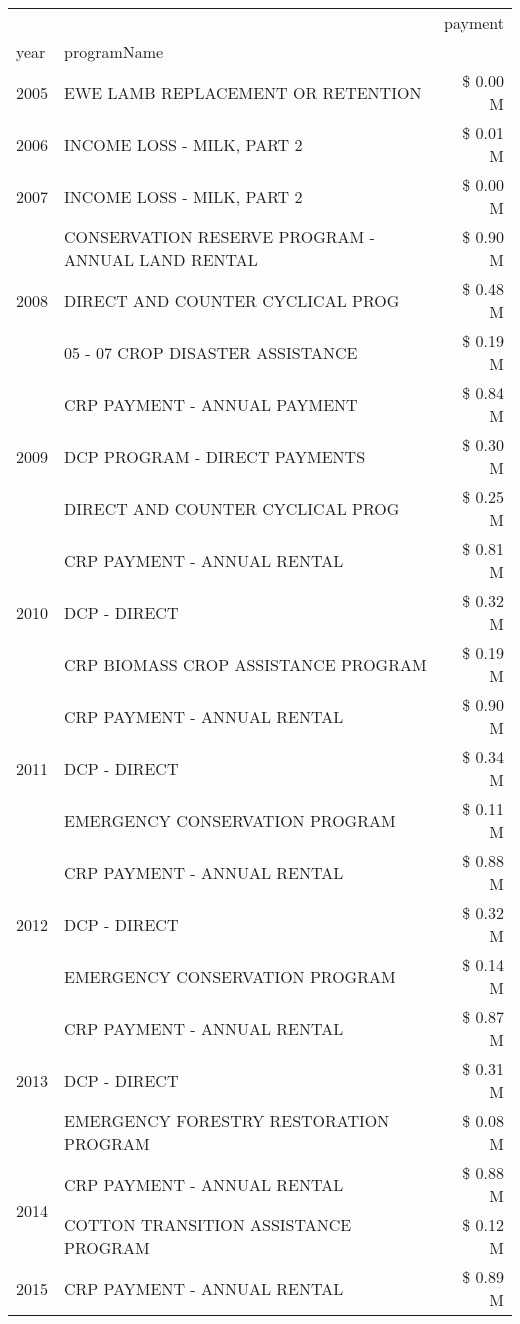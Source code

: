 \begin{tabular}{llr}
\toprule
 &  & payment \\
year & programName &  \\
\midrule
2005 & EWE LAMB REPLACEMENT OR RETENTION & \$ 0.00 M \\
\cline{1-3}
2006 & INCOME LOSS - MILK, PART 2 & \$ 0.01 M \\
\cline{1-3}
2007 & INCOME LOSS - MILK, PART 2 & \$ 0.00 M \\
\cline{1-3}
\multirow[t]{3}{*}{2008} & CONSERVATION RESERVE PROGRAM - ANNUAL LAND RENTAL & \$ 0.90 M \\
 & DIRECT AND COUNTER CYCLICAL PROG & \$ 0.48 M \\
 & 05 - 07 CROP DISASTER ASSISTANCE & \$ 0.19 M \\
\cline{1-3}
\multirow[t]{3}{*}{2009} & CRP PAYMENT - ANNUAL PAYMENT & \$ 0.84 M \\
 & DCP PROGRAM - DIRECT PAYMENTS & \$ 0.30 M \\
 & DIRECT AND COUNTER CYCLICAL PROG & \$ 0.25 M \\
\cline{1-3}
\multirow[t]{3}{*}{2010} & CRP PAYMENT - ANNUAL RENTAL & \$ 0.81 M \\
 & DCP - DIRECT & \$ 0.32 M \\
 & CRP BIOMASS CROP ASSISTANCE PROGRAM & \$ 0.19 M \\
\cline{1-3}
\multirow[t]{3}{*}{2011} & CRP PAYMENT - ANNUAL RENTAL & \$ 0.90 M \\
 & DCP - DIRECT & \$ 0.34 M \\
 & EMERGENCY CONSERVATION PROGRAM & \$ 0.11 M \\
\cline{1-3}
\multirow[t]{3}{*}{2012} & CRP PAYMENT - ANNUAL RENTAL & \$ 0.88 M \\
 & DCP - DIRECT & \$ 0.32 M \\
 & EMERGENCY CONSERVATION PROGRAM & \$ 0.14 M \\
\cline{1-3}
\multirow[t]{3}{*}{2013} & CRP PAYMENT - ANNUAL RENTAL & \$ 0.87 M \\
 & DCP - DIRECT & \$ 0.31 M \\
 & EMERGENCY FORESTRY RESTORATION PROGRAM & \$ 0.08 M \\
\cline{1-3}
\multirow[t]{2}{*}{2014} & CRP PAYMENT - ANNUAL RENTAL & \$ 0.88 M \\
 & COTTON TRANSITION ASSISTANCE PROGRAM & \$ 0.12 M \\
\cline{1-3}
\multirow[t]{3}{*}{2015} & CRP PAYMENT - ANNUAL RENTAL & \$ 0.89 M \\

\end{tabular}
